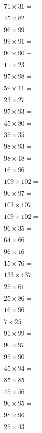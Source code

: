 \documentclass{numbersense}
\begin{document}
\begin{questions}
\q[2201] $71 \times 31 = $\ans

\q[3690] $45 \times 82 = $\ans

\q[9504] $96 \times 99 = $\ans

\q[9009] $99 \times 91 = $\ans

\q[8100] $90 \times 90 = $\ans

\q[253] $11 \times 23 = $\ans

\q[9506] $97 \times 98 = $\ans

\q[649] $59 \times 11 = $\ans

\q[621] $23 \times 27 = $\ans

\q[9021] $97 \times 93 = $\ans

\q[3600] $45 \times 80 = $\ans

\q[1225] $35 \times 35 = $\ans

\q[9114] $98 \times 93 = $\ans

\q[1764] $98 \times 18 = $\ans

\q[1536] $16 \times 96 = $\ans

\q[11118] $109 \times 102 = $\ans

\q[8730] $90 \times 97 = $\ans

\q[11021] $103 \times 107 = $\ans

\q[11118] $109 \times 102 = $\ans

\q[3360] $96 \times 35 = $\ans

\q[4224] $64 \times 66 = $\ans

\q[1536] $96 \times 16 = $\ans

\q[1140] $15 \times 76 = $\ans

\q[18221] $133 \times 137 = $\ans

\q[1525] $25 \times 61 = $\ans

\q[2150] $25 \times 86 = $\ans

\q[1536] $16 \times 96 = $\ans

\q[175] $7 \times 25 = $\ans

\q[9009] $91 \times 99 = $\ans

\q[8730] $90 \times 97 = $\ans

\q[8550] $95 \times 90 = $\ans

\q[4230] $45 \times 94 = $\ans

\q[7225] $85 \times 85 = $\ans

\q[2520] $45 \times 56 = $\ans

\q[8550] $90 \times 95 = $\ans

\q[9408] $98 \times 96 = $\ans

\q[1075] $25 \times 43 = $\ans


\end{questions}
\end{document}
